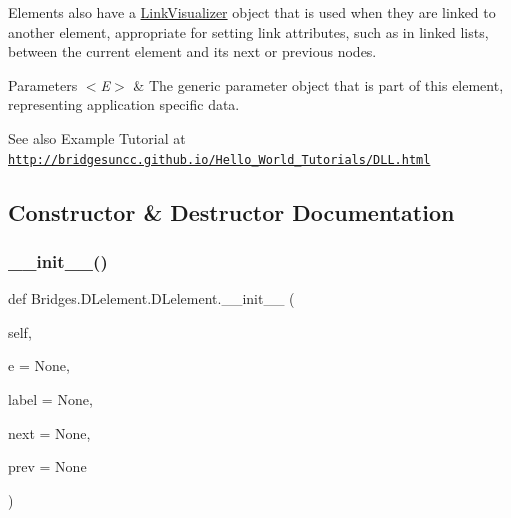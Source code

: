 Elements also have a \mbox{\hyperlink{namespace_bridges_1_1_link_visualizer}{Link\+Visualizer}} object that is used when they are linked to another element, appropriate for setting link attributes, such as in linked lists, between the current element and its next or previous nodes.


\begin{DoxyParams}{Parameters}
{\em $<$\+E$>$} & The generic parameter object that is part of this element, representing application specific data.\\
\hline
\end{DoxyParams}
\begin{DoxySeeAlso}{See also}
Example Tutorial at ~\newline
 \href{http://bridgesuncc.github.io/Hello_World_Tutorials/DLL.html}{\tt http\+://bridgesuncc.\+github.\+io/\+Hello\+\_\+\+World\+\_\+\+Tutorials/\+D\+L\+L.\+html} 
\end{DoxySeeAlso}


\subsection{Constructor \& Destructor Documentation}
\mbox{\label{class_bridges_1_1_d_lelement_1_1_d_lelement_ab25b4475c850ba7ec3b326df8e43e861}} 
\subsubsection{\texorpdfstring{\+\_\+\+\_\+init\+\_\+\+\_\+()}{\_\_init\_\_()}}
{\footnotesize\ttfamily def Bridges.\+D\+Lelement.\+D\+Lelement.\+\_\+\+\_\+init\+\_\+\+\_\+ (\begin{DoxyParamCaption}\item[{}]{self,  }\item[{}]{e = {\ttfamily None},  }\item[{}]{label = {\ttfamily None},  }\item[{}]{next = {\ttfamily None},  }\item[{}]{prev = {\ttfamily None} }\end{DoxyParamCaption})}



